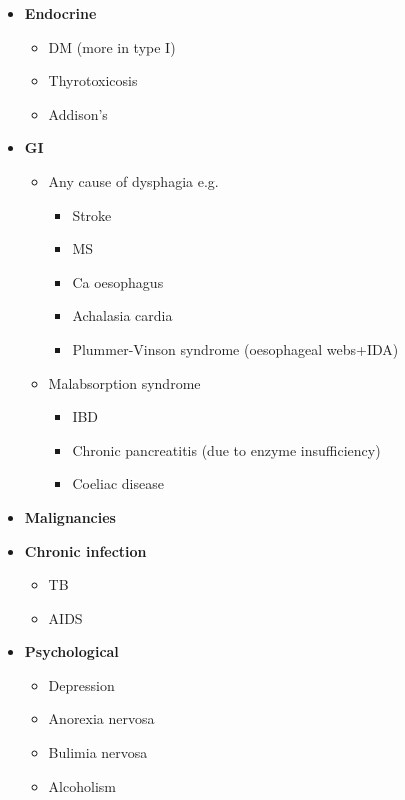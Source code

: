 \documentclass[
  12pt,
]{memoir}
\providecommand{\tightlist}{%
  \setlength{\itemsep}{0pt}\setlength{\parskip}{0pt}}
\begin{document}
\begin{itemize}
\tightlist
\item
  \textbf{Endocrine}

  \begin{itemize}
  \tightlist
  \item
    DM (more in type I)
  \item
    Thyrotoxicosis
  \item
    Addison's
  \end{itemize}
\item
  \textbf{GI}

  \begin{itemize}
  \tightlist
  \item
    Any cause of dysphagia e.g.

    \begin{itemize}
    \tightlist
    \item
      Stroke
    \item
      MS
    \item
      Ca oesophagus
    \item
      Achalasia cardia
    \item
      Plummer-Vinson syndrome (oesophageal webs+IDA)
    \end{itemize}
  \item
    Malabsorption syndrome

    \begin{itemize}
    \tightlist
    \item
      IBD
    \item
      Chronic pancreatitis (due to enzyme insufficiency)
    \item
      Coeliac disease
    \end{itemize}
  \end{itemize}
\item
  \textbf{Malignancies}
\item
  \textbf{Chronic infection}

  \begin{itemize}
  \tightlist
  \item
    TB
  \item
    AIDS
  \end{itemize}
\item
  \textbf{Psychological}

  \begin{itemize}
  \tightlist
  \item
    Depression
  \item
    Anorexia nervosa
  \item
    Bulimia nervosa
  \item
    Alcoholism
  \end{itemize}
\end{itemize}
\end{document}
